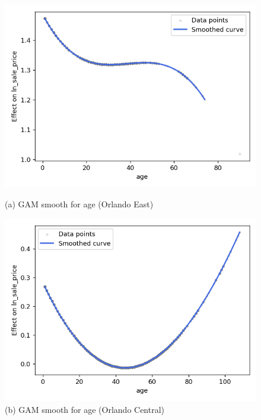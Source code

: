 \begin{figure}[H]
  \centering
  \begin{minipage}[t]{0.48\textwidth}
    \centering
    \includegraphics[width=\linewidth]{Figures/orlando_east_age_smooth.png}
    \caption*{\small (a) GAM smooth for age (Orlando East)}
  \end{minipage}
  \hfill
  \begin{minipage}[t]{0.48\textwidth}
    \centering
    \includegraphics[width=\linewidth]{Figures/orlando_central_age_smooth.png}
    \caption*{\small(b) GAM smooth for age (Orlando Central)}
  \end{minipage}
\end{figure}



